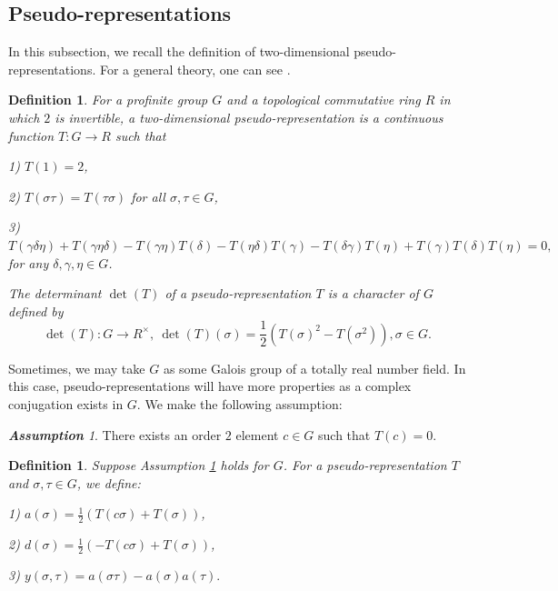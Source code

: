 \documentclass[a4paper, 12pt]{amsart}
\newtheorem{defn}[thm]{Definition} \theoremstyle{remark}
\newtheorem{assumption}[thm]{\bf Assumption}
\begin{document}
	\subsection{Pseudo-representations}\label{sec for pseudo def}
	
	In this subsection, we recall the definition of two-dimensional pseudo-representations. For a general theory, one can see \cite{bc09}.
	
	\begin{defn} \label{pseudo}
		For a profinite group $G$ and a topological commutative ring $R$ in which $2$ is invertible, a two-dimensional \textit{pseudo-representation} is a continuous function $T: G \to R$ such that 
		
		1) $T(1)=2$,
		
		2) $T(\sigma \tau)=T(\tau \sigma)$ for all $ \sigma, \tau \in G$,
		
		3) $T(\gamma \delta \eta)+T(\gamma \eta \delta)-T(\gamma \eta)T(\delta)-T(\eta \delta)T(\gamma)-T(\delta \gamma)T(\eta)+T(\gamma)T(\delta)T(\eta)=0,$
		for any $\delta, \gamma,\eta\in G$.
		
		The \textit{determinant} $\operatorname{det}(T)$ of a pseudo-representation $T$ is a character of $G$ defined by $$ \operatorname{det}(T): G \to R^\times, ~
		\operatorname{det}(T)(\sigma)=\frac{1}{2}(T(\sigma)^2-T(\sigma^2)), \sigma \in G.$$
		
	\end{defn}
	
	Sometimes, we may take $G$ as some Galois group of a totally real number field. In this case, pseudo-representations will have more properties as a complex conjugation exists in $G$. We make the following assumption:
	
	\begin{assumption}\label{odd ass}
		There exists an order $2$ element $c \in G$ such that $T(c)=0$.
	\end{assumption}
		
	\begin{defn}\label{a,d}
		Suppose Assumption \ref{odd ass} holds for $G$. For a pseudo-representation $T$ and $\sigma, \tau \in G$,  we define:
		
		1) $a(\sigma)=\frac{1}{2}(T(c\sigma)+T(\sigma))$,
		
		2) $d(\sigma)=\frac{1}{2}(-T(c\sigma)+T(\sigma))$,
		
		3) $y(\sigma, \tau)=a(\sigma \tau)-a(\sigma)a(\tau).$
	\end{defn}
	
\end{document}

